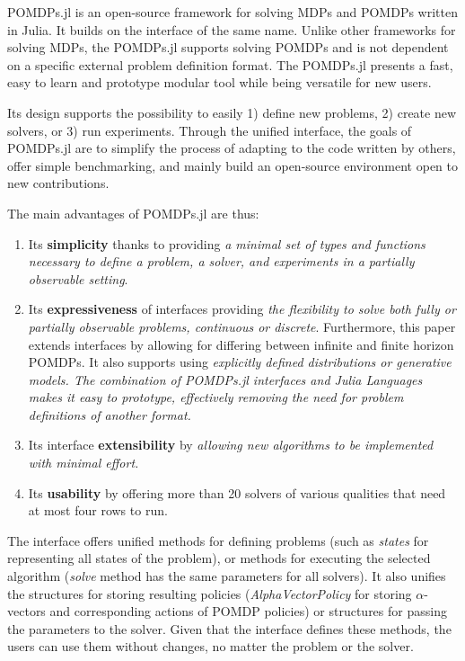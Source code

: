 POMDPs.jl \cite{egorov2017pomdps} is an open-source framework for solving MDPs and POMDPs written in Julia. It builds on the interface of the same name. Unlike other frameworks for solving MDPs, the POMDPs.jl supports solving POMDPs and is not dependent on a specific external problem definition format. The POMDPs.jl presents a fast, easy to learn and prototype modular tool while being versatile for new users.


Its design supports the possibility to easily 1) define new problems, 2) create new solvers, or 3) run experiments. Through the unified interface, the goals of POMDPs.jl are to simplify the process of adapting to the code written by others, offer simple benchmarking, and mainly build an open-source environment open to new contributions.

The main advantages of POMDPs.jl are thus: 
\begin{enumerate}
    \item Its \textbf{simplicity} thanks to providing \textit{a minimal set of types and functions necessary to define a problem, a solver, and experiments in a partially observable setting}.
    \item Its \textbf{expressiveness} of interfaces providing \textit{the flexibility to solve both fully or partially observable problems, continuous or discrete}. Furthermore, this paper extends interfaces by allowing for differing between infinite and finite horizon POMDPs. It also supports using \textit{explicitly defined distributions or generative models. The combination of POMDPs.jl interfaces and Julia Languages makes it easy to prototype, effectively removing the need for problem definitions of another format.}
    \item Its interface \textbf{extensibility} by \textit{allowing new algorithms to be implemented with minimal effort.}
    \item Its \textbf{usability} by offering more than 20 solvers of various qualities that need at most four rows to run. 
\end{enumerate} 


The interface offers unified methods for defining problems (such as \textit{states} for representing all states of the problem), or methods for executing the selected algorithm (\textit{solve} method has the same parameters for all solvers). It also unifies the structures for storing resulting policies (\textit{AlphaVectorPolicy} for storing $\alpha$-vectors and corresponding actions of POMDP policies) or structures for passing the parameters to the solver. Given that the interface defines these methods, the users can use them without changes, no matter the problem or the solver.



